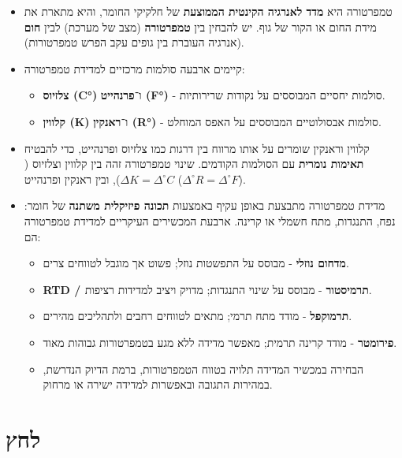 \documentclass[
  hebrew,
  letterpaper,
  DIV=11,
  numbers=noendperiod]{scrreprt}
\providecommand{\tightlist}{%
  \setlength{\itemsep}{0pt}\setlength{\parskip}{0pt}}
\begin{document}
\begin{itemize}
\item
  טמפרטורה היא \textbf{מדד לאנרגיה הקינטית הממוצעת} של חלקיקי החומר,
  והיא מתארת את מידת החום או הקור של גוף. יש להבחין בין
  \textbf{טמפרטורה} (מצב של מערכת) לבין \textbf{חום} (אנרגיה העוברת בין
  גופים עקב הפרש טמפרטורות).
\item
  קיימים ארבעה סולמות מרכזיים למדידת טמפרטורה:

  \begin{itemize}
  \tightlist
  \item
    \textbf{צלזיוס (C°)} ו־\textbf{פרנהייט (F°)} - סולמות יחסיים
    המבוססים על נקודות שרירותיות.
  \item
    \textbf{קלווין (K)} ו־\textbf{ראנקין (R°)} - סולמות אבסולוטיים
    המבוססים על האפס המוחלט.
  \end{itemize}
\item
  קלווין וראנקין שומרים על אותו מרווח בין דרגות כמו צלזיוס ופרנהייט, כדי
  להבטיח \textbf{תאימות נומרית} עם הסולמות הקודמים. שינוי טמפרטורה זהה
  בין קלווין וצלזיוס (\(\Delta K = \Delta^\circ C\)), ובין ראנקין
  ופרנהייט (\(\Delta^\circ R = \Delta^\circ F\)).
\item
  מדידת טמפרטורה מתבצעת באופן עקיף באמצעות \textbf{תכונה פיזיקלית משתנה}
  של חומר: נפח, התנגדות, מתח חשמלי או קרינה. ארבעת המכשירים העיקריים
  למדידת טמפרטורה הם:

  \begin{itemize}
  \tightlist
  \item
    \textbf{מדחום נוזלי} - מבוסס על התפשטות נוזל; פשוט אך מוגבל לטווחים
    צרים.
  \item
    \textbf{RTD / תרמיסטור} - מבוסס על שינוי התנגדות; מדויק ויציב
    למדידות רציפות.
  \item
    \textbf{תרמוקפל} - מודד מתח תרמי; מתאים לטווחים רחבים ולתהליכים
    מהירים.
  \item
    \textbf{פירומטר} - מודד קרינה תרמית; מאפשר מדידה ללא מגע בטמפרטורות
    גבוהות מאוד.
  \item
    הבחירה במכשיר המדידה תלויה בטווח הטמפרטורות, ברמת הדיוק הנדרשת,
    במהירות התגובה ובאפשרות למדידה ישירה או מרחוק.
  \end{itemize}
\end{itemize}

\section{\texorpdfstring{{לחץ}}{לחץ}}\label{ux5dcux5d7ux5e5}
\end{document}
